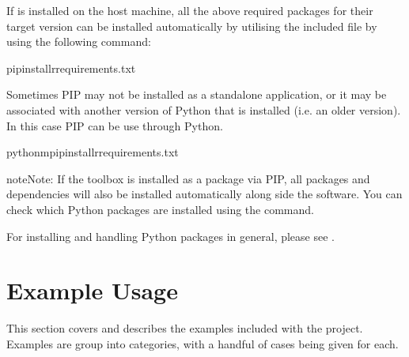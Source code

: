 \documentclass[letterpaper,10pt,english]{sphinxmanual}
\begin{document}
\sphinxAtStartPar
If  is installed on the host machine, all the above required packages for
their target version can be installed automatically by utilising the included  file by using the
following command:
\def\sphinxLiteralBlockLabel{\label{\detokenize{usage/requirements:id1}}}
\begin{sphinxVerbatim}[commandchars=\\\{\}]
pipinstall\PYGZhy{}rrequirements.txt
\end{sphinxVerbatim}

\sphinxAtStartPar
Sometimes PIP may not be installed as a standalone application, or it may be associated with another version of
Python that is installed (i.e. an older version). In this case PIP can be use through Python.
\def\sphinxLiteralBlockLabel{\label{\detokenize{usage/requirements:id2}}}
\begin{sphinxVerbatim}[commandchars=\\\{\}]
python\PYGZhy{}mpipinstall\PYGZhy{}rrequirements.txt
\end{sphinxVerbatim}

\begin{sphinxadmonition}{note}{Note:}
\sphinxAtStartPar
If the toolbox is installed as a package via PIP, all packages and dependencies will also be installed
automatically along side the software. You can check which Python packages are installed using the
 command.
\end{sphinxadmonition}

\sphinxAtStartPar
For installing and handling Python packages in general, please see
.

\sphinxstepscope


\section{Example Usage}
\label{\detokenize{usage/tutorials:example-usage}}\label{\detokenize{usage/tutorials::doc}}
\sphinxAtStartPar
This section covers and describes the examples included with the project. Examples are group into categories,
with a handful of cases being given for each.
\end{document}

